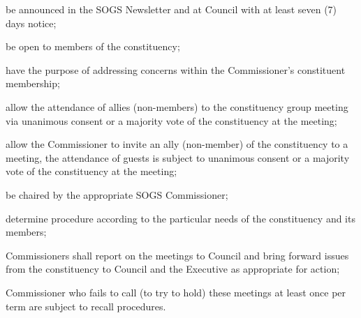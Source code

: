 \begin{longenum}[ label*=\thesubsection.\arabic*., align=left]
\begin{longenum}[ label*=\arabic*., align=left]
\item be announced in the SOGS Newsletter and at Council with at least seven (7) days notice;
\item be open to members of the constituency;
\item have the purpose of addressing concerns within the Commissioner's constituent membership;
\item allow the attendance of allies (non-members) to the constituency group meeting via unanimous consent or a majority vote of the constituency at the meeting;
\item allow the Commissioner to invite an ally (non-member) of the constituency to a meeting, the attendance of guests is subject to unanimous consent or a majority vote of the constituency at the meeting;
\item be chaired by the appropriate SOGS Commissioner;
\item determine procedure according to the particular needs of the constituency and its members;
\end{longenum}
\item Commissioners shall report on the meetings to Council and bring forward issues from the constituency to Council and the Executive as appropriate for action;
\item Commissioner who fails to call (to try to hold) these meetings at least once per term are subject to recall procedures.
\end{longenum}


